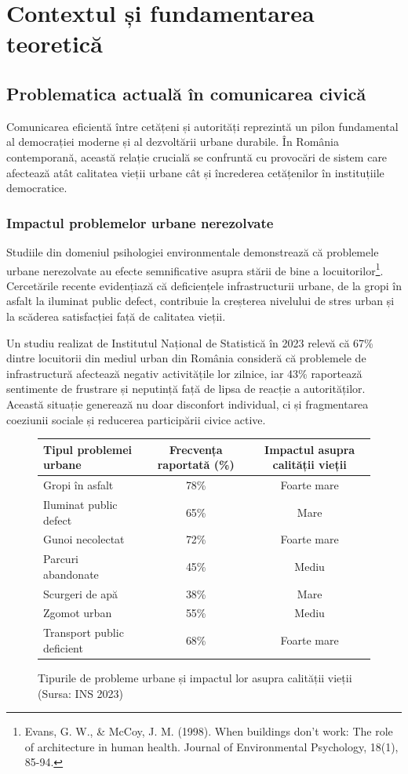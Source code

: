 \documentclass[12pt,a4paper]{report}
\begin{document}
\newpage
\chapter{Contextul și fundamentarea teoretică}

\section{Problematica actuală în comunicarea civică}

Comunicarea eficientă între cetățeni și autorități reprezintă un pilon fundamental al democrației moderne și al dezvoltării urbane durabile. În România contemporană, această relație crucială se confruntă cu provocări de sistem care afectează atât calitatea vieții urbane cât și încrederea cetățenilor în instituțiile democratice.
\subsection{Impactul problemelor urbane nerezolvate}

Studiile din domeniul psihologiei environmentale demonstrează că problemele urbane nerezolvate au efecte semnificative asupra stării de bine a locuitorilor\footnote{Evans, G. W., \& McCoy, J. M. (1998). When buildings don't work: The role of architecture in human health. Journal of Environmental Psychology, 18(1), 85-94.}. Cercetările recente evidențiază că deficiențele infrastructurii urbane, de la gropi în asfalt la iluminat public defect, contribuie la creșterea nivelului de stres urban și la scăderea satisfacției față de calitatea vieții.

Un studiu realizat de Institutul Național de Statistică în 2023 relevă că 67\% dintre locuitorii din mediul urban din România consideră că problemele de infrastructură afectează negativ activitățile lor zilnice, iar 43\% raportează sentimente de frustrare și neputință față de lipsa de reacție a autorităților. Această situație generează nu doar disconfort individual, ci și fragmentarea coeziunii sociale și reducerea participării civice active.

\begin{figure}[H]
\centering
\begin{tabular}{|l|c|c|}
\hline
\textbf{Tipul problemei urbane} & \textbf{Frecvența raportată (\%)} & \textbf{Impactul asupra calității vieții} \\
\hline
Gropi în asfalt & 78\% & Foarte mare \\
\hline
Iluminat public defect & 65\% & Mare \\
\hline
Gunoi necolectat & 72\% & Foarte mare \\
\hline
Parcuri abandonate & 45\% & Mediu \\
\hline
Scurgeri de apă & 38\% & Mare \\
\hline
Zgomot urban & 55\% & Mediu \\
\hline
Transport public deficient & 68\% & Foarte mare \\
\hline
\end{tabular}
\caption{Tipurile de probleme urbane și impactul lor asupra calității vieții (Sursa: INS 2023)}
\label{tab:probleme_urbane}
\end{figure}
\end{document}
